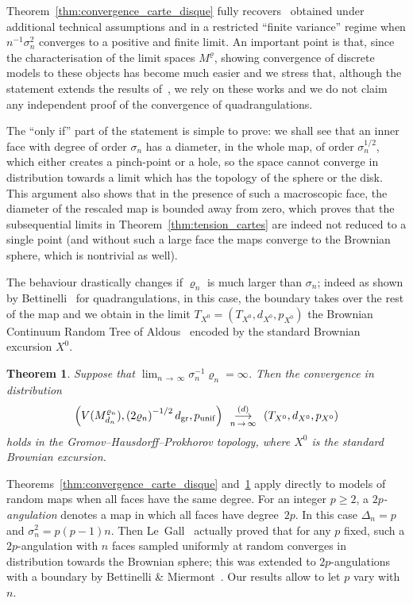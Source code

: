 \documentclass[10pt]{amsart}
\newtheorem{theo}{Theorem}[section]
\theoremstyle{definition}\newtheorem{defi}[theo]{Definition}\newtheorem{rema}[theo]{Remark}\newtheorem{exam}[theo]{Example}\newtheorem{exem}[theo]{Example}\newtheorem{nota}[theo]{Notation}
\newcommand{\1}{\ensembles{1}}
\renewcommand{\ge}{\geqslant}
\newcommand{\Bmap}{M}
\newcommand{\CRT}{T}
\newcommand{\dCRT}{d}
\newcommand{\pCRT}{p}
\newcommand{\mn}{M_{d_n}^{\varrho_n}}
\newcommand{\dgr}{d_{\mathrm{gr}}}
\newcommand{\pgr}{p_{\mathrm{unif}}}
\newcommand{\cvloi}[1][n]{\enskip\mathop{\longrightarrow}^{(d)}_{#1\,\to\, \infty}\enskip}
\providecommand{\?}{}
\begin{document}
Theorem~\ref{thm:convergence_carte_disque} fully recovers~\cite[Theorem~1]{Mar18b} obtained under additional technical assumptions and in a restricted ``finite variance'' regime when $n^{-1} \sigma_n^2$ converges to a positive and finite limit. An important point is that, since the characterisation of the limit spaces $\Bmap^\varrho$, showing convergence of discrete models to these objects has become much easier and we stress that, although the statement extends the results of~\cite{BM17,LG13, Mie13}, we rely on these works and we do not claim any independent proof of the convergence of quadrangulations.


The ``only if'' part of the statement is simple to prove: we shall see that an inner face with degree of order $\sigma_n$ has a diameter, in the whole map, of order $\sigma_n^{1/2}$, which either creates a pinch-point or a hole, so the space cannot converge in distribution towards a limit which has the topology of the sphere or the disk. This argument also shows that in the presence of such a macroscopic face, the diameter of the rescaled map is bounded away from zero, which proves that the subsequential limits in Theorem~\ref{thm:tension_cartes} are indeed not reduced to a single point (and without such a large face the maps converge to the Brownian sphere, which is nontrivial as well).


The behaviour drastically changes if $\varrho_n$ is much larger than $\sigma_n$; indeed as shown by Bettinelli~\cite[Theorem~5]{Bet15} for quadrangulations, in this case, the boundary takes over the rest of the map and we obtain in the limit $\CRT_{X^0} = (\CRT_{X^0}, \dCRT_{X^0}, \pCRT_{X^0})$ the Brownian Continuum Random Tree of Aldous~\cite{Ald93} encoded by the standard Brownian excursion $X^0$.


\begin{theo}\label{thm:convergence_cartes_CRT}
Suppose that $\lim_{n\,\to\,\infty} \sigma_n^{-1} \varrho_n = \infty$. Then the convergence in distribution
\[
\left(V(\mn), \left(2\varrho_n\right)^{-1/2} \dgr, \pgr\right) \cvloi \left(\CRT_{X^0}, \dCRT_{X^0}, \pCRT_{X^0}\right)
\]
holds in the Gromov--Hausdorff--Prokhorov topology, where $X^0$ is the standard Brownian excursion.
\end{theo}


Theorems~\ref{thm:convergence_carte_disque} and~\ref{thm:convergence_cartes_CRT} apply directly to models of random maps when all faces have the same degree. For an integer $p \ge 2$, a \emph{$2p$-angulation} denotes a map in which all faces have degree~$2p$. In this case $\Delta_n = p$ and $\sigma_n^2 = p(p-1)n$. Then Le~Gall~\cite[Theorem~1]{LG13} actually proved that for any $p$ fixed, such a $2p$-angulation with $n$ faces sampled uniformly at random converges in distribution towards the Brownian sphere; this was extended to $2p$-angulations with a boundary by Bettinelli \& Miermont~\cite[Corollary~6]{BM17}. Our results allow to let $p$ vary with $n$.
\end{document}
